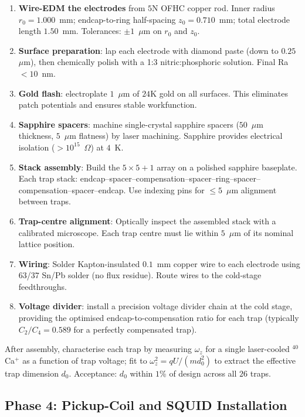 \begin{enumerate}[leftmargin=1.5em]
    \item \textbf{Wire-EDM the electrodes} from $5$N OFHC copper rod. Inner radius $r_0 = 1.000$~mm; endcap-to-ring half-spacing $z_0 = 0.710$~mm; total electrode length $1.50$~mm. Tolerances: $\pm 1$~$\mu$m on $r_0$ and $z_0$.
    \item \textbf{Surface preparation}: lap each electrode with diamond paste (down to $0.25$~$\mu$m), then chemically polish with a 1:3 nitric:phosphoric solution. Final Ra $< 10$~nm.
    \item \textbf{Gold flash}: electroplate $1$~$\mu$m of $24$K gold on all surfaces. This eliminates patch potentials and ensures stable workfunction.
    \item \textbf{Sapphire spacers}: machine single-crystal sapphire spacers ($50$~$\mu$m thickness, $5$~$\mu$m flatness) by laser machining. Sapphire provides electrical isolation ($> 10^{15}$~$\Omega$) at $4$~K.
    \item \textbf{Stack assembly}: Build the $5\times5+1$ array on a polished sapphire baseplate. Each trap stack: endcap--spacer--compensation--spacer--ring--spacer--compensation--spacer--endcap. Use indexing pins for $\le 5$~$\mu$m alignment between traps.
    \item \textbf{Trap-centre alignment}: Optically inspect the assembled stack with a calibrated microscope. Each trap centre must lie within $5$~$\mu$m of its nominal lattice position.
    \item \textbf{Wiring}: Solder Kapton-insulated $0.1$~mm copper wire to each electrode using $63$/$37$ Sn/Pb solder (no flux residue). Route wires to the cold-stage feedthroughs.
    \item \textbf{Voltage divider}: install a precision voltage divider chain at the cold stage, providing the optimised endcap-to-compensation ratio for each trap (typically $C_2/C_4 = 0.589$ for a perfectly compensated trap).
\end{enumerate}

After assembly, characterise each trap by measuring $\omega_z$ for a single laser-cooled $^{40}$Ca$^+$ as a function of trap voltage; fit to $\omega_z^2 = qU/(md_0^2)$ to extract the effective trap dimension $d_0$. Acceptance: $d_0$ within $1$\% of design across all $26$ traps.

\subsection{Phase 4: Pickup-Coil and SQUID Installation}
\label{subsec:phase4_pickup}

